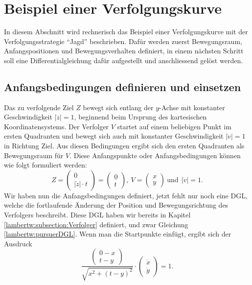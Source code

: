 %
%
%
\section{Beispiel einer Verfolgungskurve
\label{lambertw:section:teil4}}
In diesem Abschnitt wird rechnerisch das Beispiel einer Verfolgungskurve mit der Verfolgungsstrategie ``Jagd'' beschrieben. Dafür werden zuerst Bewegungsraum, Anfangspositionen und Bewegungsverhalten definiert, in einem nächsten Schritt soll eine Differentialgleichung dafür aufgestellt und anschliessend gelöst werden.

\subsection{Anfangsbedingungen definieren und einsetzen
	\label{lambertw:subsection:Anfangsbedingungen}}
Das zu verfolgende Ziel \(Z\) bewegt sich entlang der \(y\)-Achse mit konstanter Geschwindigkeit \(|\dot{z}| = 1\), beginnend beim Ursprung des kartesischen Koordinatensystems. Der Verfolger \(V\) startet auf einem beliebigen Punkt im ersten Quadranten und bewegt sich auch mit konstanter Geschwindigkeit \(|\dot{v}| = 1\) in Richtung Ziel. Aus diesen Bedingungen ergibt sich den ersten Quadranten als Bewegungsraum für \(V\). Diese Anfangspunkte oder Anfangsbedingungen können wie folgt formuliert werden:
\begin{equation}
	Z
	=
	\left( \begin{array}{c} 0 \\ |\dot{z}| \cdot t \end{array} \right)
	=
	\left( \begin{array}{c} 0 \\ t \end{array} \right)
	,\:
	V
	=
	\left( \begin{array}{c} x \\ y \end{array} \right)
	\:\text{und}\:\:
	|\dot{v}|
	=
	1.
	\label{lambertw:Anfangsbed}
\end{equation}
Wir haben nun die Anfangsbedingungen definiert, jetzt fehlt nur noch eine DGL, welche die fortlaufende Änderung der Position und Bewegungsrichtung des Verfolgers beschreibt. 
Diese DGL haben wir bereits in Kapitel \ref{lambertw:subsection:Verfolger} definiert, und zwar Gleichung \eqref{lambertw:pursuerDGL}. Wenn man die Startpunkte einfügt, ergibt sich der Ausdruck
\begin{equation}
	\frac{\left( \begin{array}{c} 0-x \\ t-y \end{array} \right)}{\sqrt{x^2 + (t-y)^2}}
	\cdot
	\left(\begin{array}{c} \dot{x} \\ \dot{y} \end{array}\right)
	=
	1.
	\label{lambertw:eqMitAnfangsbed}
\end{equation}

